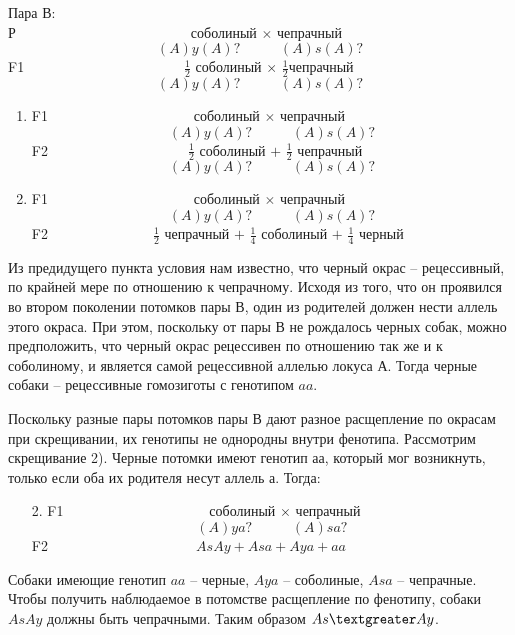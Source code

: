 Пара В:\\
Р$\hspace{150pt}$соболиный $\times$ чепрачный
$$(A)y(A)?\hspace{34pt}(A)s(A)?$$
F1$\hspace{137pt}\frac{1}{2}$ соболиный $\times$ $\frac{1}{2}$чепрачный
$$(A)y(A)?\hspace{34pt}(A)s(A)?$$
\begin{enumerate}
\item F1$\hspace{125pt}$соболиный $\times$ чепрачный
$$(A)y(A)?\hspace{34pt}(A)s(A)?$$
F2$\hspace{120pt}\frac{1}{2}$ соболиный $+$ $\frac{1}{2}$ чепрачный
$$(A)y(A)?\hspace{34pt}(A)s(A)?$$
\item F1$\hspace{125pt}$соболиный $\times$ чепрачный
$$(A)y(A)?\hspace{34pt}(A)s(A)?$$
F2$\hspace{90pt}\frac{1}{2}$ чепрачный $+$ $\frac{1}{4}$ соболиный $+$ $\frac{1}{4}$ черный

\end{enumerate}

Из предидущего пункта условия нам известно, что черный окрас – рецессивный, по крайней мере по отношению к чепрачному. Исходя из того, что он проявился во втором поколении потомков пары В, один из родителей должен нести аллель этого окраса. При этом, поскольку от пары В не рождалось черных собак, можно предположить, что черный окрас рецессивен по отношению так же и к соболиному, и является самой рецессивной аллелью локуса А. Тогда черные собаки – рецессивные гомозиготы с генотипом $aa$.

Поскольку разные пары потомков пары В дают разное расщепление по окрасам при скрещивании, их генотипы не однородны внутри фенотипа. Рассмотрим скрещивание 2). Черные потомки имеют генотип аа, который мог возникнуть, только если оба их родителя несут аллель а. Тогда:

\begin{enumerate}
\item [2.] F1$\hspace{125pt}$соболиный $\times$ чепрачный
$$(A)ya?\hspace{34pt}(A)sa?$$
F2$\hspace{127pt}AsAy+Asa+Aya + aa$

\end{enumerate}
Собаки имеющие генотип $aa$ – черные, $Aya$ – соболиные, $Asa$ – чепрачные. Чтобы получить наблюдаемое в потомстве расщепление по фенотипу, собаки $AsAy$ должны быть чепрачными. Таким образом $As\textgreater Ay$.


